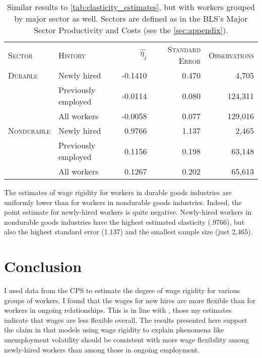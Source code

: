 \documentclass[11pt]{article}
\begin{document}
\begin{table}
    \centering
    \begin{tabular}{llrrr} \toprule
       \textsc{Sector}     & \textsc{History}    & $\hat{\eta_j}$ & \textsc{Standard Error} & \textsc{Observations}\\
       \textsc{Durable}    & Newly hired         & -0.1410        & 0.470                   & 4,705       \\
                           & Previously employed & -0.0114        & 0.080                   & 124,311     \\
                           & All workers         & -0.0058        & 0.077                   & 129,016     \\
       \textsc{Nondurable} & Newly hired         & 0.9766         & 1.137                   & 2,465       \\
                           & Previously employed & 0.1156         & 0.198                   & 63,148      \\
                           & All workers         & 0.1267         & 0.202                   & 65,613      \\ \bottomrule
    \end{tabular}
    \caption{
                Similar results to \autoref{tab:elasticity_estimates}, but with workers grouped by major sector as well. Sectors are defined as in the BLS's Major Sector Productivity and Costs (see the \autoref{sec:appendix}).
            }
    \label{tab:elasticity_estimates_sector}
\end{table}

The estimates of wage rigidity for workers in durable goods industries are uniformly lower than for workers in nondurable goods industries.
Indeed, the point estimate for newly-hired workers is quite negative.
Newly-hired workers in nondurable goods industries have the highest estimated elasticity (.9766), but also the highest standard error (1.137) and the smallest sample size (just 2,465).

\section{Conclusion}

I used data from the CPS to estimate the degree of wage rigidity for various groups of workers.
I found that the wages for new hires are more flexible than for workers in ongoing relationships.
This is in line with \cite{haefke_sonntag_vanRens_2013}, those my estimates indicate that wages are less flexible overall.
The results presented here support the claim in \cite{pissarides_2009} that models using wage rigidity to explain phenomena like unemployment volatility should be consistent with more wage flexibility among newly-hired workers than among those in ongoing employment.
\end{document}
